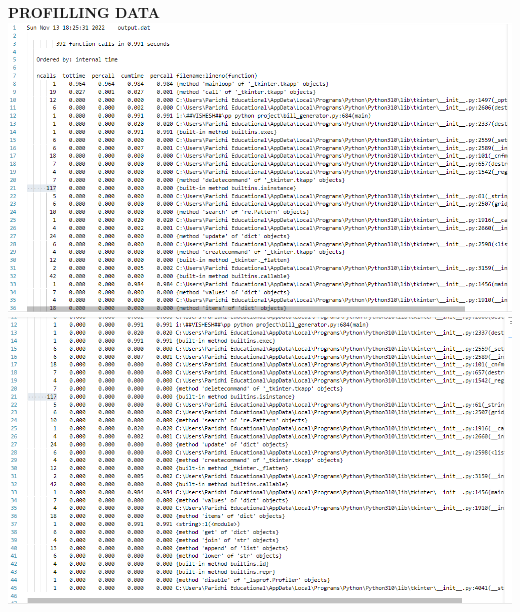 \documentclass[11pt,a4paper]{article}
\begin{document}
\pagebreak

\begin{center}
\textbf{PROFILLING DATA}\\
\includegraphics[scale = .7]{profiling1.png}\\
\includegraphics[scale = .7]{profiling2.png}\\
\end{center}


\pagebreak
\end{document}
